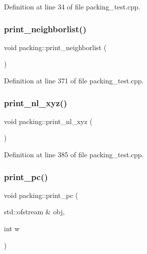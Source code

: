 Definition at line 34 of file packing\+\_\+test.\+cpp.

\mbox{\label{classpacking_aec21a0ddfaaa3153f016ee91901b0197}} 
\subsubsection{\texorpdfstring{print\+\_\+neighborlist()}{print\_neighborlist()}}
{\footnotesize\ttfamily void packing\+::print\+\_\+neighborlist (\begin{DoxyParamCaption}{ }\end{DoxyParamCaption})}



Definition at line 371 of file packing\+\_\+test.\+cpp.

\mbox{\label{classpacking_a2b2c2908beb3d2577c01d4db73e7e2c1}} 
\subsubsection{\texorpdfstring{print\+\_\+nl\+\_\+xyz()}{print\_nl\_xyz()}}
{\footnotesize\ttfamily void packing\+::print\+\_\+nl\+\_\+xyz (\begin{DoxyParamCaption}{ }\end{DoxyParamCaption})}



Definition at line 385 of file packing\+\_\+test.\+cpp.

\mbox{\label{classpacking_ac48b7b4764be70a7c3c9728687593f0e}} 
\subsubsection{\texorpdfstring{print\+\_\+pc()}{print\_pc()}}
{\footnotesize\ttfamily void packing\+::print\+\_\+pc (\begin{DoxyParamCaption}\item[{std\+::ofstream \&}]{obj,  }\item[{int}]{w }\end{DoxyParamCaption})}



